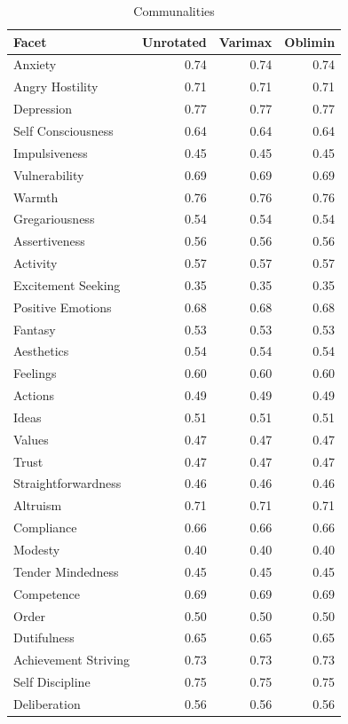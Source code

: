 \documentclass{article}\usepackage[]{graphicx}\usepackage[]{color}
\newenvironment{knitrout}{}{} %
\begin{document}
\begin{knitrout}
\begin{table}
\caption{\label{tab:unnamed-chunk-11}Communalities}
\centering
\begin{tabular}[t]{lrrr}
\toprule
Facet & Unrotated & Varimax & Oblimin\\
\midrule
Anxiety & 0.74 & 0.74 & 0.74\\
Angry Hostility & 0.71 & 0.71 & 0.71\\
Depression & 0.77 & 0.77 & 0.77\\
Self Consciousness & 0.64 & 0.64 & 0.64\\
Impulsiveness & 0.45 & 0.45 & 0.45\\
\addlinespace
Vulnerability & 0.69 & 0.69 & 0.69\\
Warmth & 0.76 & 0.76 & 0.76\\
Gregariousness & 0.54 & 0.54 & 0.54\\
Assertiveness & 0.56 & 0.56 & 0.56\\
Activity & 0.57 & 0.57 & 0.57\\
\addlinespace
Excitement Seeking & 0.35 & 0.35 & 0.35\\
Positive Emotions & 0.68 & 0.68 & 0.68\\
Fantasy & 0.53 & 0.53 & 0.53\\
Aesthetics & 0.54 & 0.54 & 0.54\\
Feelings & 0.60 & 0.60 & 0.60\\
\addlinespace
Actions & 0.49 & 0.49 & 0.49\\
Ideas & 0.51 & 0.51 & 0.51\\
Values & 0.47 & 0.47 & 0.47\\
Trust & 0.47 & 0.47 & 0.47\\
Straightforwardness & 0.46 & 0.46 & 0.46\\
\addlinespace
Altruism & 0.71 & 0.71 & 0.71\\
Compliance & 0.66 & 0.66 & 0.66\\
Modesty & 0.40 & 0.40 & 0.40\\
Tender Mindedness & 0.45 & 0.45 & 0.45\\
Competence & 0.69 & 0.69 & 0.69\\
\addlinespace
Order & 0.50 & 0.50 & 0.50\\
Dutifulness & 0.65 & 0.65 & 0.65\\
Achievement Striving & 0.73 & 0.73 & 0.73\\
Self Discipline & 0.75 & 0.75 & 0.75\\
Deliberation & 0.56 & 0.56 & 0.56\\
\bottomrule
\end{tabular}
\end{table}


\end{knitrout}
\end{document}
